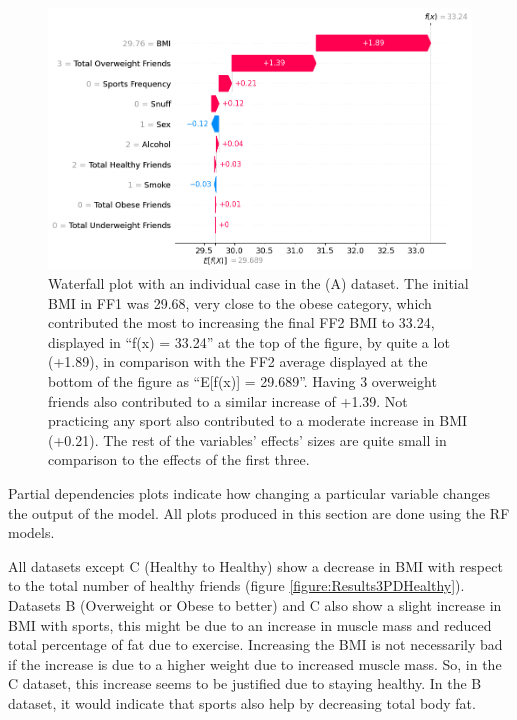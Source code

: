     \begin{figure}[ht]
        \centering
            \includegraphics[width=0.9\linewidth]{figures/Results/ResultThree/Person ModelRFA 36.png} 
        \caption{Waterfall plot with an individual case in the (A) dataset. The initial BMI in FF1 was 29.68, very close to the obese category, which contributed the most to increasing the final FF2 BMI to 33.24, displayed in “f(x) = 33.24” at the top of the figure, by quite a lot (+1.89), in comparison with the FF2 average displayed at the bottom of the figure as “E[f(x)] = 29.689”. Having 3 overweight friends also contributed to a similar increase of +1.39. Not practicing any sport also contributed to a moderate increase in BMI (+0.21). The rest of the variables' effects’ sizes are quite small in comparison to the effects of the first three. }
        \label{figure:ResultsSHAP2}
    \end{figure}

Partial dependencies plots indicate how changing a particular variable changes the output of the model. All plots produced in this section are done using the RF models.

All datasets except C (Healthy to Healthy) show a decrease in BMI with respect to the total number of healthy friends (figure \ref{figure:Results3PDHealthy}). Datasets B (Overweight or Obese to better) and C also show a slight increase in BMI with sports, this might be due to an increase in muscle mass and reduced total percentage of fat due to exercise. Increasing the BMI is not necessarily bad if the increase is due to a higher weight due to increased muscle mass. So, in the C dataset, this increase seems to be justified due to staying healthy. In the B dataset, it would indicate that sports also help by decreasing total body fat. 

